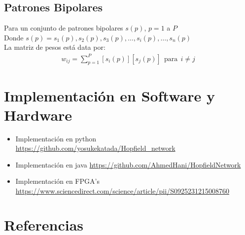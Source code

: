 \documentclass{article}
\begin{document}
\subsection{Patrones Bipolares}
Para un conjunto de patrones bipolares $s(p)$, $p=1$ a $P$\\
Donde $s(p) = s_1(p), s_2(p), s_3(p), \dots, s_i(p),\dots, s_n(p)$\\
La matriz de pesos está data por: 
\begin{align}
w_{ij} = \sum_{p=1}^{P}[s_i(p)][s_j(p)]\ \  \text{para}\ \  i \ne j
\end{align}

\section{Implementación en Software y Hardware}
\begin{itemize}
	\item Implementación en python \url{https://github.com/yosukekatada/Hopfield_network}
	\item Implementación en java \url{https://github.com/AhmedHani/HopfieldNetwork}
	\item Implementación en FPGA's \url{https://www.sciencedirect.com/science/article/pii/S0925231215008760}
\end{itemize}

\section{Referencias}
\printbibliography[heading=none] 
\end{document}
